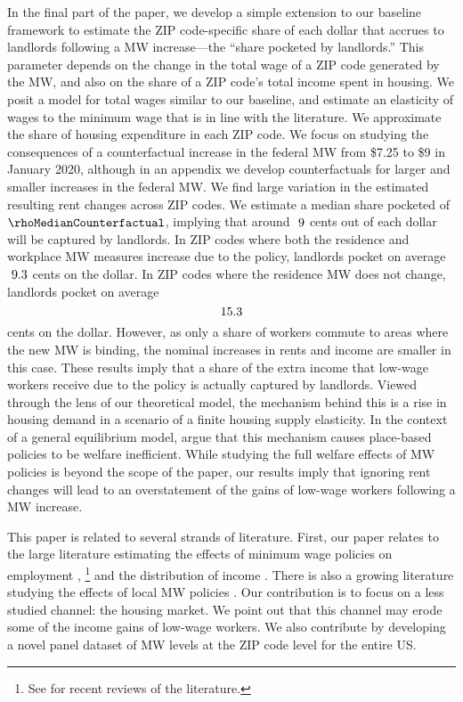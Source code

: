 
In the final part of the paper, we develop a simple extension to our baseline 
framework to estimate the ZIP code-specific share of each dollar that accrues to 
landlords following a MW increase---the ``share pocketed by landlords.''
This parameter depends on the change in the total wage of a ZIP code generated
by the MW, and also on the share of a ZIP code's total income spent in housing.
We posit a model for total wages similar to our baseline, and estimate an 
elasticity of wages to the minimum wage that is in line with the literature.
We approximate the share of housing expenditure in each ZIP code.
We focus on studying the consequences of a counterfactual increase in the federal 
MW from \$7.25 to \$9 in January 2020, although in an appendix we develop 
counterfactuals for larger and smaller increases in the federal MW.
We find large variation in the estimated resulting rent changes across ZIP codes.
We estimate a median share pocketed of $\rhoMedianCounterfactual$, 
implying that around $\textnormal{ 9}$ cents out of each dollar will 
be captured by landlords.
In ZIP codes where both the residence and workplace MW measures increase due to 
the policy, landlords pocket on average $\textnormal{ 9.3}$ cents on the 
dollar.
In ZIP codes where the residence MW does not change, landlords pocket on average
$$\textnormal{15.3}$$ cents on the dollar.
However, as only a share of workers commute to areas where the new MW is 
binding, the nominal increases in rents and income are smaller in this case.
These results imply that a share of the extra income that low-wage workers
receive due to the policy is actually captured by landlords.
Viewed through the lens of our theoretical model,
the mechanism behind this is a rise in housing demand in a scenario of a 
finite housing supply elasticity.
In the context of a general equilibrium model, \textcite{KlineMoretti2014} argue
that this mechanism causes place-based policies to be welfare inefficient.
While studying the full welfare effects of MW policies is beyond the scope of 
the paper, our results imply that ignoring rent changes will lead to an 
overstatement of the gains of low-wage workers following a MW increase.


This paper is related to several strands of literature.
First, our paper relates to the large literature estimating the effects of 
minimum wage policies on employment
\parencite[e.g.,][]{CardKrueger1994, NeumarkWascher2007, MeerWest2016, CegnizEtAl2019},%
\footnote{See \textcite{Dube2019, NeumarkShirley2021} for recent reviews of the 
literature.} 
and the distribution of income 
\parencite[e.g.,][]{Lee1999, AutorEtAl2016, Dube2019Income}.
There is also a growing literature studying the effects of local MW 
policies \parencite[e.g.,][]{DubeNaiduReich2007, SchmittRosnick2011, DubeLindner2021}.
Our contribution is to focus on a less studied channel: the housing market.
We point out that this channel may erode some of the income gains of low-wage 
workers.
We also contribute by developing a novel panel dataset of MW levels at the 
ZIP code level for the entire US.

